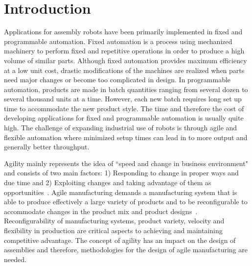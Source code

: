 \section{Introduction}
Applications for assembly robots have been primarily implemented in fixed and programmable automation. Fixed automation is a process using mechanized machinery to perform fixed and repetitive operations in order to produce a high volume of similar parts. Although fixed automation provides maximum efficiency at a low unit cost, drastic modifications of the machines are realized when parts need major changes or become too complicated in design. In programmable automation, products are made in batch quantities ranging from several dozen to several thousand units at a time. However, each new batch requires long set up time to accommodate the new product style. The time and therefore the cost of developing applications for fixed and programmable automation is usually quite high. The challenge of expanding industrial use of robots is through agile and flexible automation where minimized setup times can lead in to more output and generally better throughput.



Agility mainly represents the idea of ``speed and change in business environment" and consists of two main factors: 1) Responding to change in proper ways and due time and 2) Exploiting changes and taking advantage of them as opportunities~\cite{SHARIFI.1999}. Agile manufacturing demands a manufacturing system that is able to produce effectively a large variety of products and to be reconfigurable to accommodate changes in the product mix and product designs~\cite{GUNASEKARAN.1999}. Reconfigurability of manufacturing systems, product variety, velocity and flexibility in production are critical aspects to achieving and maintaining competitive advantage. The concept of agility has an impact on the design of assemblies and therefore, methodologies for the design of agile manufacturing are needed.

